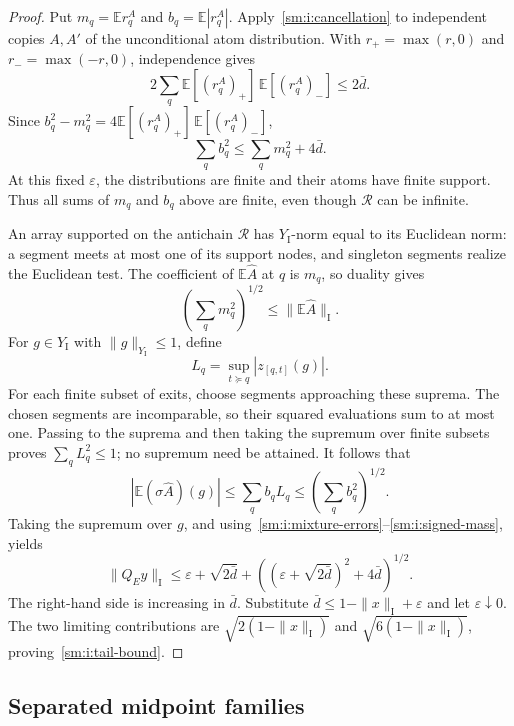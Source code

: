 \begin{proof}
Put $m_q=\mathbb E r_q^A$ and $b_q=\mathbb E|r_q^A|$.
Apply~\eqref{sm:i:cancellation} to independent copies $A,A'$ of the
unconditional atom distribution.  With $r_+=\max(r,0)$ and
$r_-=\max(-r,0)$, independence gives
\[
 2\sum_q\mathbb E[(r_q^A)_+]\,\mathbb E[(r_q^A)_-]
 \leq2\bar d.
\]
Since $b_q^2-m_q^2=4\mathbb E[(r_q^A)_+]\,\mathbb E[(r_q^A)_-]$,
\begin{equation}
 \sum_q b_q^2\leq\sum_qm_q^2+4\bar d.
 \label{sm:i:unsigned-mass}
\end{equation}
At this fixed $\varepsilon$, the distributions are finite and their
atoms have finite support.  Thus all sums of $m_q$ and $b_q$ above are
finite, even though $\mathcal R$ can be infinite.

An array supported on the antichain $\mathcal R$ has
$Y_{\mathrm I}$-norm equal to its Euclidean norm: a segment meets at
most one of its support nodes, and singleton segments realize the
Euclidean test.  The coefficient of $\mathbb E\widehat A$ at $q$ is
$m_q$, so duality gives
\begin{equation}
 \left(\sum_qm_q^2\right)^{1/2}
 \leq\|\mathbb E\widehat A\|_{\mathrm I}.
 \label{sm:i:signed-mass}
\end{equation}
For $g\in Y_{\mathrm I}$ with $\|g\|_{Y_{\mathrm I}}\leq1$, define
\[
 L_q=\sup_{t\succeq q}|z_{[q,t]}(g)|.
\]
For each finite subset of exits, choose segments approaching these
suprema.  The chosen segments are incomparable, so their squared
evaluations sum to at most one.  Passing to the suprema and then taking
the supremum over finite subsets proves $\sum_qL_q^2\leq1$;
no supremum need be attained.  It follows that
\[
 |\mathbb E(\sigma\widehat A)(g)|
 \leq\sum_qb_qL_q
 \leq\left(\sum_qb_q^2\right)^{1/2}.
\]
Taking the supremum over $g$, and
using~\eqref{sm:i:mixture-errors}--\eqref{sm:i:signed-mass}, yields
\[
 \|Q_Ey\|_{\mathrm I}
 \leq\varepsilon+\sqrt{2\bar d}
   +\left((\varepsilon+\sqrt{2\bar d})^2+4\bar d\right)^{1/2}.
\]
The right-hand side is increasing in $\bar d$.  Substitute
$\bar d\leq1-\|x\|_{\mathrm I}+\varepsilon$ and let
$\varepsilon\downarrow0$.  The two limiting contributions are
$\sqrt{2(1-\|x\|_{\mathrm I})}$ and
$\sqrt{6(1-\|x\|_{\mathrm I})}$, proving~\eqref{sm:i:tail-bound}.
\end{proof}

\subsection{Separated midpoint families}

